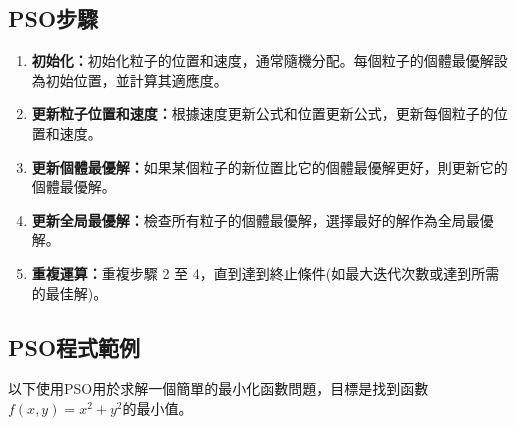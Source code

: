 \subsection{PSO步驟}
\begin{enumerate}
    \item \textbf{初始化：}初始化粒子的位置和速度，通常隨機分配。每個粒子的個體最優解設為初始位置，並計算其適應度。
    \item \textbf{更新粒子位置和速度：}根據速度更新公式和位置更新公式，更新每個粒子的位置和速度。
    \item \textbf{更新個體最優解：}如果某個粒子的新位置比它的個體最優解更好，則更新它的個體最優解。
    \item \textbf{更新全局最優解：}檢查所有粒子的個體最優解，選擇最好的解作為全局最優解。
    \item \textbf{重複運算：}重複步驟 2 至 4，直到達到終止條件(如最大迭代次數或達到所需的最佳解)。
\end{enumerate}

\subsection{PSO程式範例}
以下使用PSO用於求解一個簡單的最小化函數問題，目標是找到函數$f(x,y) = x^2 + y^2$的最小值。

